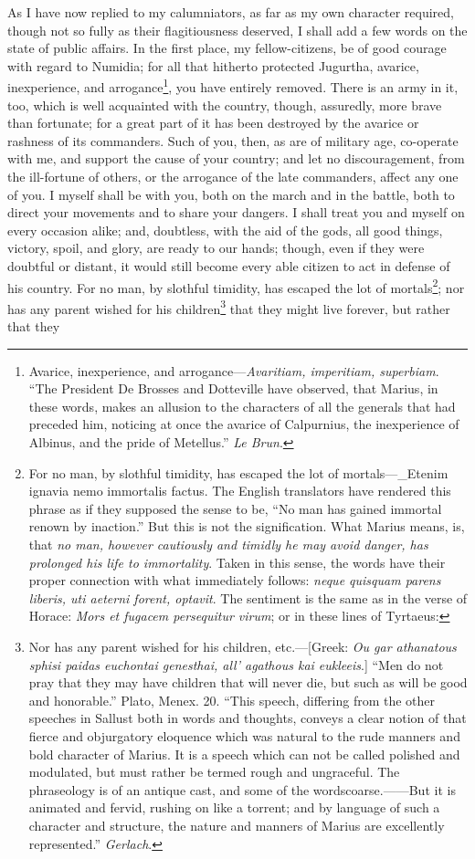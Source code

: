 As I have now replied to my calumniators, as far as my own character
required, though not so fully as their flagitiousness deserved, I
shall add a few words on the state of public affairs. In the first
place, my fellow-citizens, be of good courage with regard to Numidia;
for all that hitherto protected Jugurtha, avarice, inexperience, and
arrogance\footnote{Avarice, inexperience, and arrogance—\emph{Avaritiam, imperitiam,
superbiam}. ``The President De Brosses and Dotteville have observed,
that Marius, in these words, makes an allusion to the characters of
all the generals that had preceded him, noticing at once the avarice
of Calpurnius, the inexperience of Albinus, and the pride of Metellus.''
\emph{Le Brun}.}, you have entirely removed. There is an army in it,
too, which is well acquainted with the country, though, assuredly,
more brave than fortunate; for a great part of it has been destroyed
by the avarice or rashness of its commanders. Such of you, then, as
are of military age, co-operate with me, and support the cause of your
country; and let no discouragement, from the ill-fortune of others, or
the arrogance of the late commanders, affect any one of you. I myself
shall be with you, both on the march and in the battle, both to direct
your movements and to share your dangers. I shall treat you and myself
on every occasion alike; and, doubtless, with the aid of the gods, all
good things, victory, spoil, and glory, are ready to our hands; though,
even if they were doubtful or distant, it would still become every able
citizen to act in defense of his country. For no man, by slothful
timidity, has escaped the lot of mortals\footnote{For no man, by slothful timidity, has escaped the lot of
mortals—\_Etenim ignavia nemo immortalis factus. The English
translators have rendered this phrase as if they supposed the sense to
be, ``No man has gained immortal renown by inaction.'' But this is not
the signification. What Marius means, is, that \emph{no man, however
cautiously and timidly he may avoid danger, has prolonged his life to
immortality}. Taken in this sense, the words have their proper
connection with what immediately follows: \emph{neque quisquam parens
liberis, uti aeterni forent, optavit}. The sentiment is the same as in
the verse of Horace: \emph{Mors et fugacem persequitur virum}; or in these
lines of Tyrtaeus:}; nor has any parent wished
for his children\footnote{Nor has any parent wished for his children, etc.—[Greek:
\emph{Ou gar athanatous sphisi paidas euchontai genesthai, all' agathous kai
eukleeis}.] ``Men do not pray that they may have children that will
never die, but such as will be good and honorable.'' Plato, Menex. 20.
``This speech, differing from the other speeches in Sallust both in
words and thoughts, conveys a clear notion of that fierce and
objurgatory eloquence which was natural to the rude manners and bold
character of Marius. It is a speech which can not be called polished
and modulated, but must rather be termed rough and ungraceful. The
phraseology is of an antique cast, and some of the wordscoarse.——But
it is animated and fervid, rushing on like a torrent; and by language
of such a character and structure, the nature and manners of Marius are
excellently represented.'' \emph{Gerlach}.} that they might live forever, but rather that they
